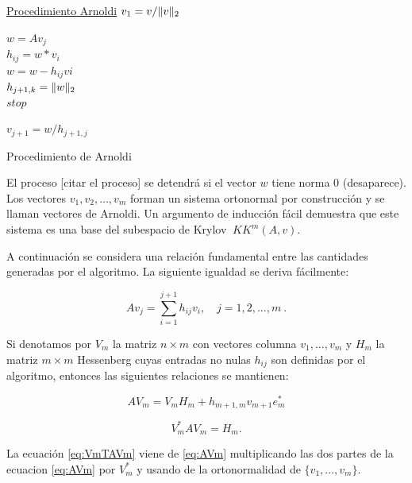 \documentclass[a4paper,openright,12pt, oneside]{book}
\DeclarePairedDelimiter\norm{\lVert}{\rVert}
\begin{document}
\begin{algorithm}
    \label{alg:arnoldi}
    \underline{Procedimiento Arnoldi}\;
    ${v_{1}} = v/\norm{v}_{2} $\\

    {
      $w = Av_j$ \\
      { 
        $h_{ij} = w*v_i$\\
        $w = w - h_{ij}v{i}$\\
      }
      $h_{j+1, k} = \norm{w}_2$\\
       {
        $stop$
       }
      
      $v_{j+1} = w/h_{j+1, j}$\\
    }
    \caption{Procedimiento de Arnoldi}

\end{algorithm}

El proceso [citar el proceso] se detendr\'a si el vector $\displaystyle w$ tiene norma 0 (desaparece).  Los vectores $ v_1, v_2, \ldots, v_m $ forman un sistema ortonormal por construcci\'on y se llaman vectores de Arnoldi. Un argumento de inducci\'on f\'acil demuestra que este sistema es una base del subespacio de Krylov $ \ KK^m(A, v) $.

A continuaci\'on se considera una relaci\'on fundamental entre las cantidades generadas por el algoritmo. La siguiente igualdad se deriva f\'acilmente:


\begin{equation}
A v_j = \sum_{i=1}^{j+1} h_{ij} v_i , \quad j=1,2,\ldots ,m \ .
\end{equation}


Si denotamos por $ V_m $ la matriz $ n \times m $ con vectores columna $ v_1,
\ldots , v_m $ y $ H_m $ la matriz $ m \times m $ Hessenberg cuyas entradas no nulas $ h_{ij} $ son definidas por el algoritmo, entonces las siguientes relaciones se mantienen:

\begin{equation}
\label{eq:AVm}
\displaystyle A V_m \textstyle = \displaystyle V_m H_m + h_{m+1,m} v_{m+1} e_m^{\ast}
\end{equation}

\begin{equation}
\label{eq:VmTAVm}
\displaystyle V_m^{\ast} A V_m \textstyle = \displaystyle H_m.
\end{equation}

La ecuaci\'on \ref{eq:VmTAVm} viene de \ref{eq:AVm} multiplicando las dos partes de la ecuacion \ref{eq:AVm} por $ V_m^{\ast}$ y usando de la ortonormalidad de $\{ v_1, \ldots,v_m \} $.
\end{document}
